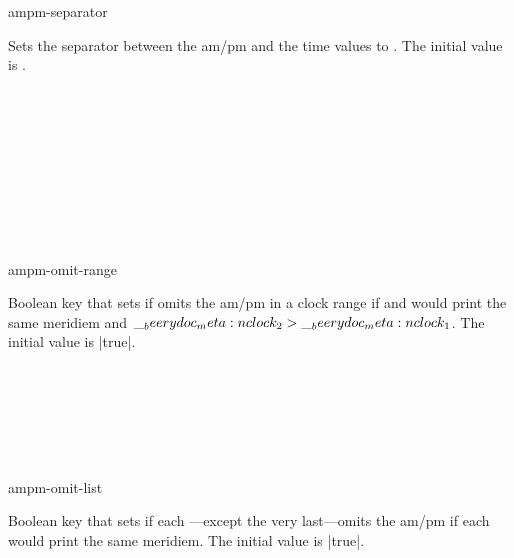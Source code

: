 \documentclass{beerydoc}
\begin{document}
\begin{codedoc}{ampm-separator}
  \begin{syntax}
  \end{syntax}
  Sets the separator between the am/pm and the time values to
  .
  The initial value is .
  \begin{codedemo}
    \\
    \\
    \\
    \\
    \\
    \\
    \\
    \\
  \end{codedemo}
\end{codedoc}

\begin{codedoc}{ampm-omit-range}
  \begin{syntax}
  \end{syntax}
  Boolean key that sets if  omits the am/pm in a clock range if
   and  would print the same meridiem and
  $\__beerydoc_meta:n {clock_2}>\__beerydoc_meta:n {clock_1}$.
  The initial value is |true|.
  \begin{codedemo}
    \\
    \\
    \\
    \\
    \\
  \end{codedemo}
\end{codedoc}

\begin{codedoc}{ampm-omit-list}
  \begin{syntax}
  \end{syntax}
  Boolean key that sets if each ---except the very last---omits the
  am/pm if each  would print the same meridiem.
  The initial value is |true|.
  \begin{codedemo}
    \\
    \\
    \\
    \\
    \\
    \\
    \\
    \\
  \end{codedemo}
\end{codedoc}
\end{document}
